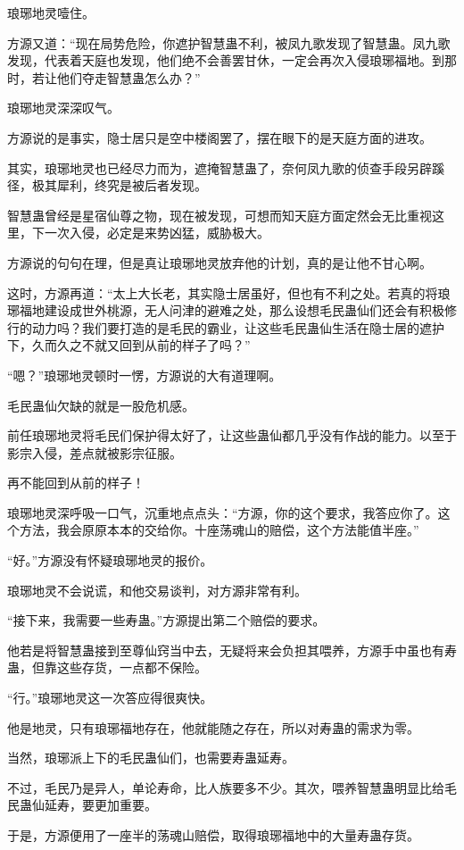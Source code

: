 \begin{this_body}
琅琊地灵噎住。

方源又道：“现在局势危险，你遮护智慧蛊不利，被凤九歌发现了智慧蛊。凤九歌发现，代表着天庭也发现，他们绝不会善罢甘休，一定会再次入侵琅琊福地。到那时，若让他们夺走智慧蛊怎么办？”

琅琊地灵深深叹气。

方源说的是事实，隐士居只是空中楼阁罢了，摆在眼下的是天庭方面的进攻。

其实，琅琊地灵也已经尽力而为，遮掩智慧蛊了，奈何凤九歌的侦查手段另辟蹊径，极其犀利，终究是被后者发现。

智慧蛊曾经是星宿仙尊之物，现在被发现，可想而知天庭方面定然会无比重视这里，下一次入侵，必定是来势凶猛，威胁极大。

方源说的句句在理，但是真让琅琊地灵放弃他的计划，真的是让他不甘心啊。

这时，方源再道：“太上大长老，其实隐士居虽好，但也有不利之处。若真的将琅琊福地建设成世外桃源，无人问津的避难之处，那么设想毛民蛊仙们还会有积极修行的动力吗？我们要打造的是毛民的霸业，让这些毛民蛊仙生活在隐士居的遮护下，久而久之不就又回到从前的样子了吗？”

“嗯？”琅琊地灵顿时一愣，方源说的大有道理啊。

毛民蛊仙欠缺的就是一股危机感。

前任琅琊地灵将毛民们保护得太好了，让这些蛊仙都几乎没有作战的能力。以至于影宗入侵，差点就被影宗征服。

再不能回到从前的样子！

琅琊地灵深呼吸一口气，沉重地点点头：“方源，你的这个要求，我答应你了。这个方法，我会原原本本的交给你。十座荡魂山的赔偿，这个方法能值半座。”

“好。”方源没有怀疑琅琊地灵的报价。

琅琊地灵不会说谎，和他交易谈判，对方源非常有利。

“接下来，我需要一些寿蛊。”方源提出第二个赔偿的要求。

他若是将智慧蛊接到至尊仙窍当中去，无疑将来会负担其喂养，方源手中虽也有寿蛊，但靠这些存货，一点都不保险。

“行。”琅琊地灵这一次答应得很爽快。

他是地灵，只有琅琊福地存在，他就能随之存在，所以对寿蛊的需求为零。

当然，琅琊派上下的毛民蛊仙们，也需要寿蛊延寿。

不过，毛民乃是异人，单论寿命，比人族要多不少。其次，喂养智慧蛊明显比给毛民蛊仙延寿，要更加重要。

于是，方源便用了一座半的荡魂山赔偿，取得琅琊福地中的大量寿蛊存货。


\end{this_body}

